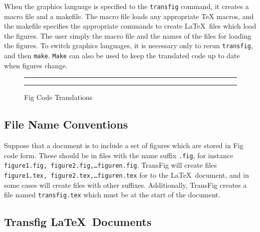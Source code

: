 When the graphics language is specified to the {\tt transfig} command,
	it creates a macro file and a makefile.
The macro file loads any appropriate TeX macros,
	and the makefile specifies the appropriate commands to create
	\LaTeX\ files which load the figures.
The user simply {\verb||} the macro file and the names of the files
	for loading the figures.
To switch graphics languages,
	it is necessary only to rerun {\tt transfig}, and then {\tt make}.
{\tt Make} can also be used to keep the translated code up to date when
	figures change.

\begin{figure}
	\hrule
	\vspace{2pt}
	\begin{center}
		
	\end{center}
	\hrule
	\caption{Fig Code Translations}
	\label{f:intro-trans}
\end{figure}
\vspace{2pt}

\vfill
\subsection{File Name Conventions}

Suppose that a document is to include a set of figures which are stored in Fig
	code form.
These should be in files with the name suffix {\tt .fig}, for instance
	{\tt figure1.fig, figure2.fig,\ldots figuren.fig}.
TransFig will create files {\tt figure1.tex, figure2.tex,\ldots figuren.tex}
	for {\verb||} to the \LaTeX\ document,
	and in some cases will create files with other suffixes.
Additionally, TransFig creates a file named {\tt transfig.tex} which
	must be {\verb||} at the start of the document.

\vfill
\subsection{Transfig \LaTeX\ Documents}

